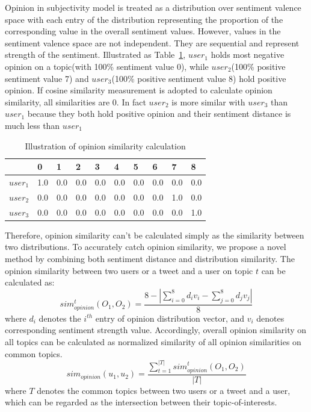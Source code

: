 \documentclass[letterpaper]{article}
\begin{document}
Opinion in subjectivity model is treated  as a distribution over sentiment valence space with each entry of the distribution representing the proportion of the corresponding value in the overall sentiment values. 
However, values in the sentiment valence space are not independent. 
They are sequential and represent strength of the sentiment. Illustrated as Table~\ref{tab1}, $ user_{1} $ holds most negative opinion on a topic(with 100\% sentiment value 0), while $ user_{2} $(100\% positive sentiment value 7) and $ user_{3} $(100\% positive sentiment value 8) hold positive opinion.
If cosine similarity measurement is adopted to calculate opinion similarity, all similarities are 0.
In fact $ user_{2} $ is more similar with $ user_{3} $ than $ user_{1} $ because they both hold positive opinion and their sentiment distance is much less than $ user_{1} $
\begin{table}[h]
\scriptsize
\centering
\caption{Illustration of opinion similarity calculation}
\label{tab1}
\begin{tabular}{|l|l|l|l|l|l|l|l|l|l|}
\hline
 & 0 & 1& 2 & 3 & 4 & 5 & 6 & 7 & 8 \\
\hline
$user_{1}$ & 1.0 & 0.0 & 0.0 & 0.0 & 0.0 & 0.0 & 0.0 & 0.0 & 0.0 \\
\hline
$user_{2}$ & 0.0 & 0.0 & 0.0 & 0.0 & 0.0 & 0.0 & 0.0 & 1.0 & 0.0 \\
\hline
$user_{3}$ & 0.0 & 0.0 & 0.0 & 0.0 & 0.0 & 0.0 & 0.0 & 0.0 & 1.0 \\
\hline
\end{tabular}
\end{table}  
Therefore, opinion similarity can't be calculated simply as the similarity between two distributions. 
To accurately catch opinion similarity, we propose a novel method by combining both sentiment distance and distribution similarity.
The opinion similarity between two users or a tweet and a user on topic $ t $ can be calculated as: 
\begin{equation}
sim_{opinion}^{t}(O_{1},O_{2})=\dfrac{8-|\sum_{i=0}^{8}d_{i}v_{i}-\sum_{j=0}^{8}d_{j}v_{j}|}{8}
\end{equation}
where $ d_{i} $ denotes the $ i^{th} $ entry of opinion distribution vector, and $ v_{i} $ denotes corresponding sentiment strength value.
Accordingly, overall opinion similarity on all topics can be calculated as normalized similarity of all opinion similarities on common topics. 
\begin{equation}
sim_{opinion}(u_{1},u_{2})=\dfrac{\sum_{t=1}^{|T|}sim_{opinion}^{t}(O_{1},O_{2})}{|T|}
\end{equation}
where $ T $ denotes the common topics between two users or a tweet and a user, which can be regarded as the intersection between their topic-of-interests. 
\end{document}
